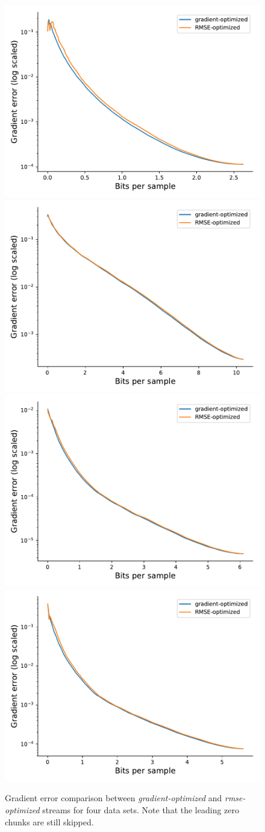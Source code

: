 \begin{figure}
	\centering
	{\includegraphics[width=0.48\linewidth]{img/gradient-laplacian/euler-gradient.pdf}}
	{\includegraphics[width=0.48\linewidth]{img/gradient-laplacian/magnetic-gradient.pdf}}
	{\includegraphics[width=0.48\linewidth]{img/gradient-laplacian/miranda-diffusivity-gradient.pdf}}
	{\includegraphics[width=0.48\linewidth]{img/gradient-laplacian/miranda-velocityz-gradient.pdf}}
	\caption{Gradient error comparison between \emph{gradient-optimized} and \emph{rmse-optimized}
	streams for four data sets. Note that the leading zero chunks are still skipped.}
	\label{fig:gradient-error-comparison}
\end{figure}

